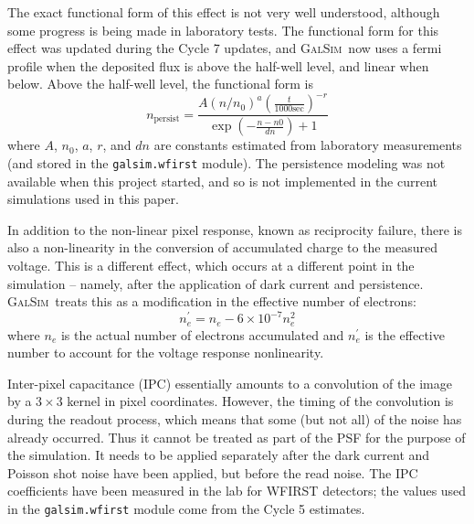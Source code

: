 \documentclass[aps,prd, amsmath,amssymb,superscriptaddress,showkeys,nofootinbib,reprint,preprintnumbers]{revtex4-1}
\newcommand{\galsim}{\textsc{GalSim}}
\begin{document}
The exact functional form of this effect is not very well understood, although some progress is being made in laboratory tests.  
The functional form for this effect was updated during the Cycle 7 updates, and
\galsim\ now uses a fermi profile when the deposited flux is above the half-well level, and linear when below.
Above the half-well level, the functional form is
\begin{equation}
n_\mathrm{persist} = \frac{A \left(n/n_0\right)^a  \left(\frac{t}{1000 \mathrm{sec}}\right)^{-r}}
{ \exp(- \frac{n-n0}{dn})+ 1}
\end{equation}
where $A$, $n_0$, $a$, $r$, and $dn$ are constants estimated from laboratory measurements (and stored in the \texttt{galsim.wfirst} module).
The persistence modeling was not available when this project started, and so is not implemented in the current simulations used in this paper.

In addition to the non-linear pixel response, known as reciprocity failure, there is also a non-linearity in the conversion of accumulated charge to the measured voltage.
This is a different effect, which occurs at a different point in the simulation -- namely, after the application of dark current and persistence. 
\galsim\ treats this as a modification in the effective number of electrons:
\begin{equation}
n_e^\prime = n_e - 6 \times 10^{-7} n_e^2
\end{equation}
where $n_e$ is the actual number of electrons accumulated and $n_e^\prime$ is the effective number to account for the voltage response nonlinearity.

Inter-pixel capacitance (IPC) \cite{2016PASP..128i5001K} essentially amounts to a convolution of the image by a $3 \times 3$ kernel in pixel coordinates.
However, the timing of the convolution is during the readout process, which means that some (but not all) of the noise has already occurred.  
Thus it cannot be treated as part of the PSF for the purpose of the simulation.  
It needs to be applied separately after the dark current and Poisson shot noise have been applied, but before the read noise.  
The IPC coefficients have been measured in the lab for WFIRST detectors; the values used in the \texttt{galsim.wfirst} module come from the Cycle 5 estimates. 
\end{document}
